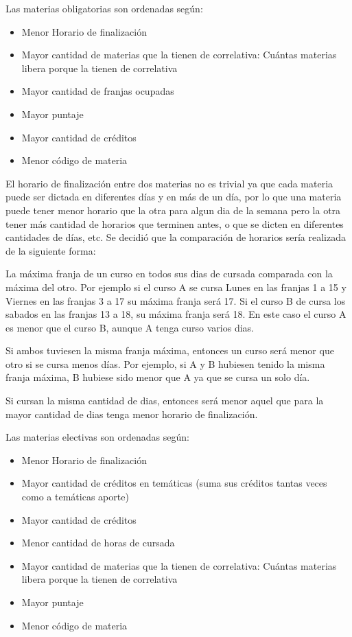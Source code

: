 \documentclass[a4paper]{article}
\begin{document}
Las materias obligatorias son ordenadas según:

\begin{itemize}
	\item Menor Horario de finalización
    \item Mayor cantidad de materias que la tienen de correlativa: Cuántas materias libera porque la tienen de correlativa
	\item Mayor cantidad de franjas ocupadas
	\item Mayor puntaje
	\item Mayor cantidad de créditos
	\item Menor código de materia
\end{itemize}

El horario de finalización entre dos materias no es trivial ya que cada materia puede ser dictada en diferentes días y en más de un día, por lo que una materia puede tener menor horario que la otra para algun dia de la semana pero la otra tener más cantidad de horarios que terminen antes, o que se dicten en diferentes cantidades de días, etc. Se decidió que la comparación de horarios sería realizada de la siguiente forma:\newline

La máxima franja de un curso en todos sus dias de cursada comparada con la máxima del otro. Por ejemplo si el curso A se cursa Lunes en las franjas 1 a 15 y Viernes en las franjas 3 a 17 su máxima franja será 17. Si el curso B de cursa los sabados en las franjas 13 a 18, su máxima franja será 18. En este caso el curso A es menor que el curso B, aunque A tenga curso varios dias.

Si ambos tuviesen la misma franja máxima, entonces un curso será menor que otro si se cursa menos días. Por ejemplo, si A y B hubiesen tenido la misma franja máxima, B hubiese sido menor que A ya que se cursa un solo día.

Si cursan la misma cantidad de dias, entonces será menor aquel que para la mayor cantidad de dias tenga menor horario de finalización.\newline

Las materias electivas son ordenadas según:

\begin{itemize}
	\item Menor Horario de finalización
	\item Mayor cantidad de créditos en temáticas (suma sus créditos tantas veces como a temáticas aporte)
	\item Mayor cantidad de créditos
	\item Menor cantidad de horas de cursada
    \item Mayor cantidad de materias que la tienen de correlativa: Cuántas materias libera porque la tienen de correlativa
	\item Mayor puntaje
	\item Menor código de materia
\end{itemize}
\end{document}
